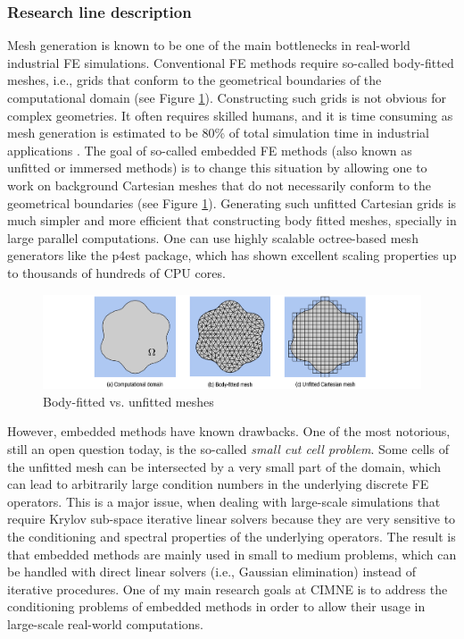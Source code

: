 \documentclass{article}
\newcommand{\bemph}[1]{#1}
\begin{document}
\subsubsection{Research line description}


Mesh generation is known to be one of the main bottlenecks in real-world industrial FE simulations. Conventional FE methods require so-called body-fitted meshes, i.e., grids that conform to the geometrical boundaries of the computational domain (see Figure \ref{fig:fitted-vs-unfitted}). Constructing such grids is not obvious for complex geometries. It often requires skilled humans, and it is time consuming as mesh generation is estimated to be 80\% of total simulation time in industrial applications \cite{cottrell_2009}. The goal of so-called embedded FE methods \cite{burman_2015} (also known as unfitted or immersed methods) is to change this situation by allowing one to work on background Cartesian meshes that do not necessarily conform to the geometrical boundaries (see Figure \ref{fig:fitted-vs-unfitted}). Generating such unfitted Cartesian grids is much simpler and more efficient that constructing body fitted meshes, specially in large parallel computations.  One can use highly scalable octree-based mesh generators like the p4est package, which has shown excellent scaling properties up to thousands of hundreds of CPU cores. 

\begin{figure}[ht!]
\includegraphics[width=\textwidth]{../_assets/fig1.png}
\caption{Body-fitted vs. unfitted meshes}
\label{fig:fitted-vs-unfitted}
\end{figure}


However, embedded methods have known drawbacks. One of the most notorious, still an open question today, is the so-called \emph{small cut cell problem}. Some cells of the unfitted mesh can be intersected by a very small part of the domain, which can lead to arbitrarily large condition numbers in the underlying discrete FE operators. This is a major issue, when dealing with large-scale simulations that require Krylov sub-space iterative linear solvers  because they are very sensitive to the conditioning and spectral properties of the underlying operators. The result is that embedded methods are mainly used in small to medium problems, which can be handled with direct linear solvers (i.e., Gaussian elimination) instead of iterative procedures. \bemph{One of my main research goals at CIMNE is to address the conditioning problems of embedded methods in order to allow their usage in large-scale real-world computations}.
\end{document}
